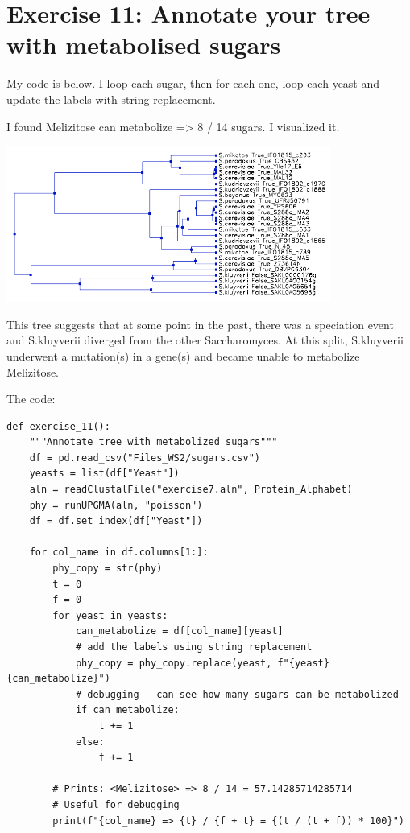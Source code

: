\documentclass{article} %
\begin{document}
\section{Exercise 11: Annotate your tree with metabolised sugars}

My code is below. I loop each sugar, then for each one, loop each yeast and update the labels with string replacement.

I found Melizitose can metabolize => 8 / 14 sugars. I visualized it.

\includegraphics[width=0.8\textwidth]{tree2.png}

This tree suggests that at some point in the past, there was a speciation event and S.kluyverii diverged from the other Saccharomyces. At this split, S.kluyverii underwent a mutation(s) in a gene(s) and became unable to metabolize Melizitose.

The code:

\begin{verbatim}
def exercise_11():
    """Annotate tree with metabolized sugars"""
    df = pd.read_csv("Files_WS2/sugars.csv")
    yeasts = list(df["Yeast"])
    aln = readClustalFile("exercise7.aln", Protein_Alphabet)
    phy = runUPGMA(aln, "poisson")
    df = df.set_index(df["Yeast"])

    for col_name in df.columns[1:]:
        phy_copy = str(phy)
        t = 0
        f = 0
        for yeast in yeasts:
            can_metabolize = df[col_name][yeast]
            # add the labels using string replacement
            phy_copy = phy_copy.replace(yeast, f"{yeast} {can_metabolize}")
            # debugging - can see how many sugars can be metabolized
            if can_metabolize:
                t += 1
            else:
                f += 1

        # Prints: <Melizitose> => 8 / 14 = 57.14285714285714
        # Useful for debugging
        print(f"{col_name} => {t} / {f + t} = {(t / (t + f)) * 100}")
\end{verbatim}
\end{document}
